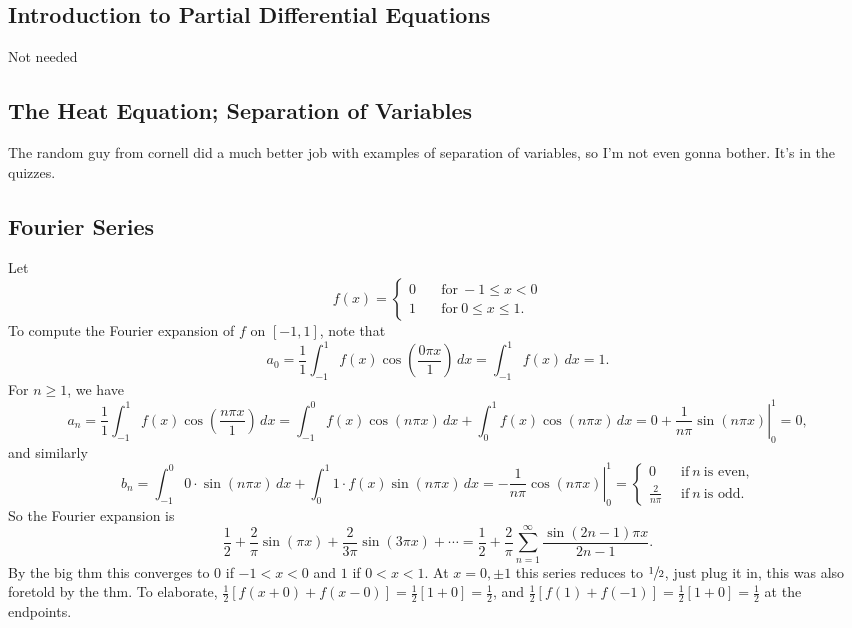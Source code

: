 \subsection{Introduction to Partial Differential Equations}
Not needed

\subsection{The Heat Equation; Separation of Variables}
\begin{example}
    The random guy from cornell did a much better job with examples of separation of variables, so I'm not even gonna bother. It's in the quizzes.
\end{example}

\subsection{Fourier Series}
\begin{example}
    Let  \[
        f(x)=\begin{cases}
        0 \quad & \text{for} \ -1\leq x<0\\
        1 & \text{for} \ 0\leq x\leq 1.
    \end{cases}
\] To compute the Fourier expansion of $f$ on $[-1,1]$, note that \[
a_0=\frac{1}{1}\int_{-1}^{1} f(x)\cos \left( \frac{0\pi x}{1} \right)  \, dx=\int_{-1}^{1} f(x) \, dx =1.
\] For $n\geq 1$, we have \[
a_n =\frac{1}{1} \int_{-1}^{1} f(x) \cos \left( \frac{n\pi x}{1} \right)  \, dx=\int_{-1}^{0} f(x)\cos (n\pi x) \, dx+ \int_{0}^{1} f(x)\cos (n\pi x) \, dx=0+ \left. \frac{1}{n\pi}\sin(n\pi x) \right| _{0}^1=0,
\] and similarly \[
b_n = \int_{-1}^{0} 0\cdot \sin (n\pi x) \, dx+ \int_{0}^{1} 1\cdot f(x)\sin (n\pi x) \, dx=\left. -\frac{1}{n\pi}\cos(n\pi x) \right| _0^1=
    \begin{cases}
        0 \quad &\text{if} \ n \ \text{is even,} \\
        \frac{2}{n\pi}& \text{if} \ n \ \text{is odd.}
    \end{cases}
\]  So the Fourier expansion is \[
\frac{1}{2}+\frac{2}{\pi}\sin(\pi x)+\frac{2}{3\pi}\sin (3\pi x)+\cdots = \frac{1}{2}+ \frac{2}{\pi}\sum_{n=1}^{\infty} \frac{\sin (2n-1)\pi x}{2n-1}.
\] By the big thm this converges to 0 if $-1<x<0$ and $1$ if $0<x<1$. At $x=0,\pm 1$ this series reduces to $\sfrac{1}{2}$, just plug it in, this was also foretold by the thm. To elaborate, $\frac{1}{2}\left[ f(x+0)+f(x-0) \right] =\frac{1}{2}[1+0]=\frac{1}{2}$, and $\frac{1}{2}\left[ f(1)+f(-1) \right] =\frac{1}{2}[1+0]=\frac{1}{2}$ at the endpoints.
\end{example}
